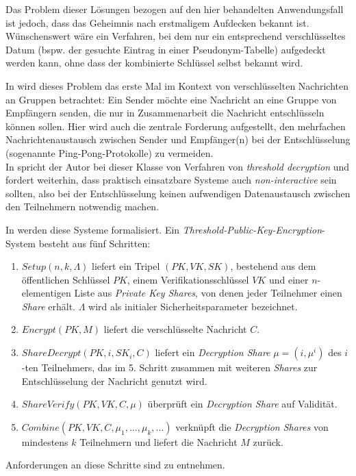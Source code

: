 \documentclass[
    fontsize=12pt,
    headings=small,
    parskip=half,           %
    bibliography=totoc,
    numbers=noenddot,       %
    open=any,               %
   final                   %
    ]{scrreprt}
\begin{document}
Das Problem dieser Lösungen bezogen auf den hier behandelten Anwendungsfall ist jedoch, dass das Geheimnis nach erstmaligem Aufdecken bekannt ist. Wünschenswert wäre ein Verfahren, bei dem nur ein entsprechend verschlüsseltes Datum (bspw. der gesuchte Eintrag in einer Pseudonym-Tabelle) aufgedeckt werden kann, ohne dass der kombinierte Schlüssel selbst bekannt wird. 


In \cite{desmedt1987} wird dieses Problem das erste Mal im Kontext von verschlüsselten Nachrichten an Gruppen betrachtet: Ein Sender möchte eine Nachricht an eine Gruppe von Empfängern senden, die nur in Zusammenarbeit die Nachricht entschlüsseln können sollen. Hier wird auch die zentrale Forderung aufgestellt, den mehrfachen Nachrichtenaustausch zwischen Sender und Empfänger(n) bei der Entschlüsselung (sogenannte Ping-Pong-Protokolle) zu vermeiden. \\
In \cite{desmedt1993} spricht der Autor bei dieser Klasse von Verfahren von \textit{threshold decryption} und fordert weiterhin, dass praktisch einsatzbare Systeme auch \textit{non-interactive} sein sollten, also bei der Entschlüsselung keinen aufwendigen Datenaustausch zwischen den Teilnehmern notwendig machen.

In \cite{boneh2006} werden diese Systeme formalisiert. Ein \textit{Threshold-Public-Key-Encryption}-System besteht aus fünf Schritten:
\begin{enumerate}
	\item \(Setup(n,k,\Lambda)\) liefert ein Tripel \((PK, VK, SK)\), bestehend aus dem öffentlichen Schlüssel \(PK\), einem Verifikationsschlüssel \(VK\) und einer \(n\)-elementigen Liste aus \textit{Private Key Shares}, von denen jeder Teilnehmer einen \textit{Share} erhält. \(\Lambda\) wird als initialer Sicherheitsparameter bezeichnet.
	\item \(Encrypt(PK, M)\) liefert die verschlüsselte Nachricht \(C\).
	\item \(ShareDecrypt(PK, i, SK_i, C)\) liefert ein \textit{Decryption Share} \(\mu=(i, \mu^i)\) des \(i\)-ten Teilnehmers, das im 5. Schritt zusammen mit weiteren \textit{Shares} zur Entschlüsselung der Nachricht genutzt wird.
	\item \(ShareVerify(PK, VK, C, \mu)\) überprüft ein \textit{Decryption Share} auf Validität.
	\item \(Combine(PK, VK, C, {\mu_1, \dots,\mu_k, \dots})\) verknüpft die \textit{Decryption Shares} von mindestens \(k\) Teilnehmern und liefert die Nachricht \(M\) zurück.
\end{enumerate}
Anforderungen an diese Schritte sind \cite{boneh2006} zu entnehmen. 
\end{document}
